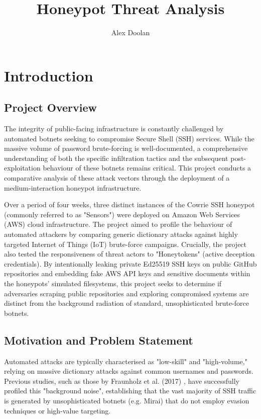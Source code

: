 \documentclass[]{article}
\title{Honeypot Threat Analysis}
\author{Alex Doolan}
\date{}
\begin{document}
	
\maketitle

\section{Introduction}

\subsection{Project Overview}

The integrity of public-facing infrastructure is constantly challenged by automated botnets seeking to compromise Secure Shell (SSH) services. While the massive volume of password brute-forcing is well-documented, a comprehensive understanding of both the specific infiltration tactics and the subsequent post-exploitation behaviour of these botnets remains critical. This project conducts a comparative analysis of these attack vectors through the deployment of a medium-interaction honeypot infrastructure.

Over a period of four weeks, three distinct instances of the Cowrie SSH honeypot (commonly referred to as "Sensors") were deployed on Amazon Web Services (AWS) cloud infrastructure. The project aimed to profile the behaviour of automated attackers by comparing generic dictionary attacks against highly targeted Internet of Things (IoT) brute-force campaigns. Crucially, the project also tested the responsiveness of threat actors to "Honeytokens" (active deception credentials). By intentionally leaking private Ed25519 SSH keys on public GitHub repositories and embedding fake AWS API keys and sensitive documents within the honeypots' simulated filesystems, this project seeks to determine if adversaries scraping public repositories and exploring compromised systems are distinct from the background radiation of standard, unsophisticated brute-force botnets.

\subsection{Motivation and Problem Statement}

Automated attacks are typically characterised as "low-skill" and "high-volume," relying on massive dictionary attacks against common usernames and passwords. Previous studies, such as those by Fraunholz et al. (2017) \cite{fraunholz2017investigation}, have successfully profiled this "background noise", establishing that the vast majority of SSH traffic is generated by unsophisticated botnets (e.g. Mirai) that do not employ evasion techniques or high-value targeting.
\end{document}
